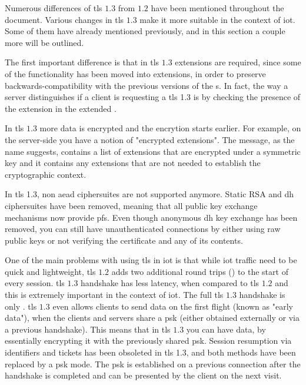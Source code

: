 \documentclass{llncs}
\begin{document}
Numerous differences of \gls{tls} $1.3$ from $1.2$ have been mentioned throughout the document.
Various changes in \gls{tls} $1.3$ make it more suitable in the context
of \gls{iot}. Some of them have already mentioned previously, and in this section a couple more will be outlined.

The first important difference is that in \gls{tls} $1.3$ extensions are required,
since some of the functionality has been moved into extensions, in order to preserve
backwards-compatibility with the previous versions of the s.
In fact, the way a server distinguishes if a client is requesting a \gls{tls} 1.3
is by checking the presence of the  extension in the
extended .

In \gls{tls} $1.3$ more data is encrypted and the encrytion starts earlier. For example,
on the server-side you have a notion of "encrypted extensions". The 
message, as the name suggests, contains a list of extensions that are encrypted
under a symmetric key and it contains any extensions that are not needed
to establish the cryptographic context.

In \gls{tls} 1.3, non \gls{aead} ciphersuites are not supported anymore.
Static RSA and \gls{dh} ciphersuites have been removed, meaning that all
public key exchange mechanisms now provide \gls{pfs}. Even though
anonymous \gls{dh} key exchange has been removed, you can still have
unauthenticated connections by either using raw public keys or not verifying the
certificate and any of its contents.

One of the main problems with using \gls{tls} in \gls{iot} is that while \gls{iot}
traffic need to be quick and lightweight, \gls{tls} $1.2$ adds two additional
round trips () to the start of every session. \gls{tls} $1.3$ handshake has less latency,
when compared to \gls{tls} $1.2$ and this is extremely important in the context of \gls{iot}.
The full \gls{tls} $1.3$ handshake is only . \gls{tls} $1.3$ even allows
clients to send data on the first flight (known as "early data"), when the clients
and servers share a \gls{psk} (either obtained externally or via a previous handshake).
This means that in \gls{tls} $1.3$ you can have  data, by essentially
encrypting it with the previously shared \gls{psk}. Session resumption
via identifiers and tickets has been obsoleted in \gls{tls} 1.3, and both methods
have been replaced by a \gls{psk} mode. The \gls{psk} is established on a previous
connection after the handshake is completed and can be presented by the client
on the next visit.
\end{document}

